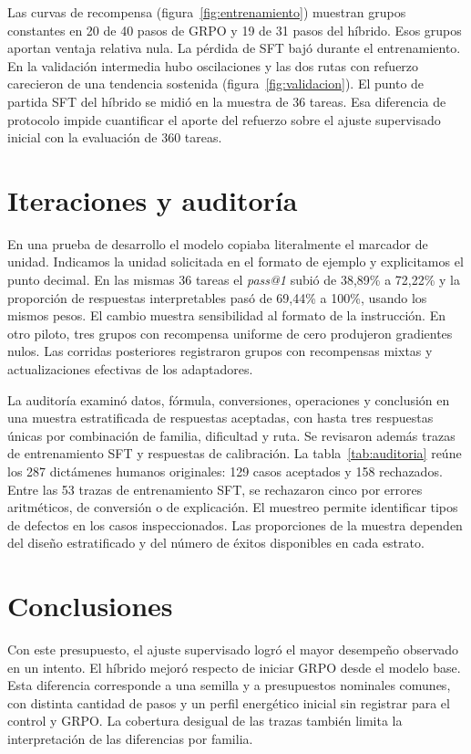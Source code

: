 Las curvas de recompensa (figura~\ref{fig:entrenamiento}) muestran grupos
constantes en 20 de 40 pasos de GRPO y 19 de 31 pasos del híbrido. Esos grupos
aportan ventaja relativa nula. La pérdida de SFT bajó durante el entrenamiento.
En la validación intermedia hubo oscilaciones y las dos rutas con refuerzo
carecieron de una tendencia sostenida (figura~\ref{fig:validacion}). El
punto de partida SFT del híbrido se midió en la muestra de 36 tareas. Esa
diferencia de protocolo impide cuantificar el aporte del refuerzo sobre el
ajuste supervisado inicial con la evaluación de 360 tareas.

\section{Iteraciones y auditoría}

En una prueba de desarrollo el modelo copiaba literalmente el marcador de
unidad. Indicamos la unidad solicitada en el formato de ejemplo y explicitamos
el punto decimal. En las mismas 36 tareas el \textit{pass@1} subió de 38,89\%
a 72,22\% y la proporción de respuestas interpretables pasó de 69,44\% a
100\%, usando los mismos pesos. El cambio muestra sensibilidad al formato
de la instrucción. En otro piloto, tres grupos con recompensa uniforme de
cero produjeron gradientes nulos. Las corridas posteriores registraron grupos
con recompensas mixtas y actualizaciones efectivas de los adaptadores.

La auditoría examinó datos, fórmula, conversiones, operaciones y conclusión
en una muestra estratificada de respuestas aceptadas, con hasta tres respuestas
únicas por combinación de familia, dificultad y ruta. Se revisaron además
trazas de entrenamiento SFT y respuestas de calibración. La
tabla~\ref{tab:auditoria} reúne los 287 dictámenes humanos originales:
129 casos aceptados y 158 rechazados. Entre las 53 trazas de entrenamiento
SFT, se rechazaron cinco por errores aritméticos, de conversión
o de explicación. El muestreo permite identificar tipos de defectos en los
casos inspeccionados. Las proporciones de la muestra dependen del diseño
estratificado y del número de éxitos disponibles en cada estrato.

\section{Conclusiones}

Con este presupuesto, el ajuste supervisado logró el mayor desempeño observado
en un intento. El híbrido mejoró respecto de iniciar GRPO desde el modelo base.
Esta diferencia corresponde a una semilla y a presupuestos nominales comunes,
con distinta cantidad de pasos y un perfil energético inicial sin registrar
para el control y GRPO. La cobertura desigual de las trazas también limita la
interpretación de las diferencias por familia.

